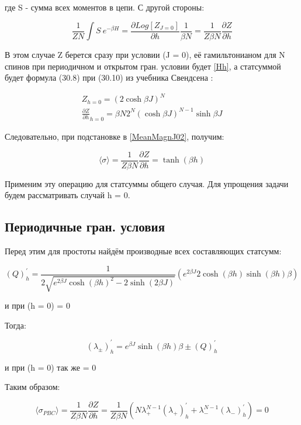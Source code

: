 \documentclass{article}
\newcommand{\bj}{\beta J}
\newcommand{\bh}{\beta h}
\newcommand{\lpm}{\lambda_{\pm}}
\newcommand{\pbc}{_{PBC}}
\newcommand{\dzdh}{\frac{\partial Z}{\partial h}}
\newcommand{\la}{\langle}
\newcommand{\ra}{\rangle}
\numberwithin{equation}{section}
\begin{document}
где S - сумма всех моментов в цепи. С другой стороны: 

\begin{equation}\label{MeanMagnJ02}
    \frac{1}{ZN} \int S\ e^{-\beta H} = \frac{\partial Log[Z_{J = 0}]}{\partial h} \frac{1}{\beta N} = \frac{1}{Z \beta N}  \dzdh
\end{equation}

В этом случае Z берется сразу при условии (J = 0), её гамильтонианом для N спинов при периодичном и открытом гран. условии будет \eqref{Hh}, а статсуммой будет формула (30.8) при (30.10) из учебника Свендсена \cite{Swen}:

\begin{gather}
    \label{Zh0} Z_{h = 0} = (2\cosh{\bj})^N \\
    \label{Z'hh0} \dzdh_{h = 0} = \beta N 2^{N}(\cosh{\bj})^{N-1}\sinh{\bj}
\end{gather}

Следовательно, при подстановке в \eqref{MeanMagnJ02}, получим:

\begin{equation}\label{MeanMagnJ0Final}
    \la\sigma\ra = \frac{1}{Z \beta N}  \dzdh = \tanh{(\bh)}  
\end{equation}

Применим эту операцию для статсуммы общего случая.
Для упрощения задачи будем рассматривать случай h = 0.

\subsection{Периодичные гран. условия}

Перед этим для простоты найдём производные всех составляющих статсумм:

\begin{equation}\label{Q'h}
    (Q)^{'}_{h} = \frac{1}{2\sqrt{e^{2\bj} \cosh{(\bh)}^{2} - 2 \sinh{(2\bj)}}}  \left( e^{2\bj}2\cosh{(\bh)} \sinh{(\bh)}  \beta\right)
\end{equation}

и при (h = 0) = 0

Тогда:

\begin{equation}\label{lpm'h}
    (\lpm)^{'}_{h} = e^{\bj}  \sinh{(\bh)} \beta \pm (Q)^{'}_{h}
\end{equation}

и при (h = 0) так же = 0

Таким образом: 

\begin{equation}\label{MeanMagnH0PBC}
    \la\sigma\pbc\ra = \frac{1}{Z  \beta  N}  \frac{\partial Z}{\partial h} = \frac{1}{Z  \beta  N}  \left( N  \lambda^{N-1}_{+}(\lambda_{+})^{'}_{h} +   \lambda^{N-1}_{-}(\lambda_{-})^{'}_{h}\right) = 0
\end{equation}
\end{document}

